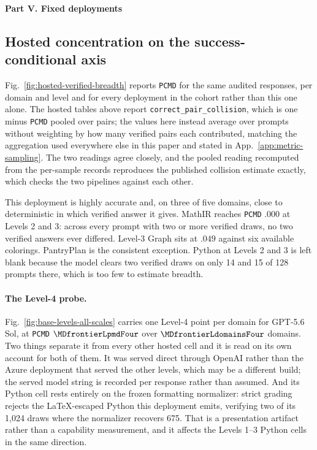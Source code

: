 \documentclass{article}
\newcommand{\1}{\mathbf 1}
\newcommand{\pmd}{\texttt{PCMD}}
\theoremstyle{remark}
\theoremstyle{definition}
\theoremstyle{plain}
\begin{document}




\clearpage
{}
\begin{center}\large\textbf{Part V. Fixed deployments}\end{center}



\subsection{Hosted concentration on the success-conditional axis}
\label{app:hosted-mode-diversity}

Fig.~\ref{fig:hosted-verified-breadth} reports \pmd{} for the same audited
responses, per domain and level and for every deployment in the cohort rather
than this one alone. The hosted tables above report \texttt{correct\_pair\_collision},
which is one minus \pmd{} pooled over pairs; the values here instead average
over prompts without weighting by how many verified pairs each contributed,
matching the aggregation used everywhere else in this paper and stated in
App.~\ref{app:metric-sampling}. The two readings agree closely,
and the pooled reading recomputed from the per-sample records reproduces the
published collision estimate exactly, which checks the two pipelines against
each other.

This deployment is highly accurate and, on three of five domains, close to
deterministic in which verified answer it gives. MathIR reaches \pmd{} $.000$
at Levels 2 and 3: across every prompt with two or more verified draws, no two
verified answers ever differed. Level-3 Graph sits at $.049$ against six
available colorings. PantryPlan is the consistent exception. Python at Levels 2
and 3 is left blank because the model clears two verified draws on only 14 and
15 of 128 prompts there, which is too few to estimate breadth.

\paragraph{The Level-4 probe.}
Fig.~\ref{fig:base-levels-all-scales} carries one Level-4 point per domain for
GPT-5.6 Sol, at \pmd{} $\MDfrontierLpmdFour$ over $\MDfrontierLdomainsFour$
domains. Two things separate it from every other hosted cell and it is read
on its own account for both of them. It was
served direct through OpenAI rather than the Azure deployment that served the
other levels, which may be a different build; the served model string is
recorded per response rather than assumed. And its Python cell rests entirely on
the frozen formatting normalizer: strict grading rejects the LaTeX-escaped
Python this deployment emits, verifying two of its 1,024 draws where the
normalizer recovers 675. That is a presentation artifact rather than a capability
measurement, and it affects the Levels 1--3 Python cells in the same direction.
\end{document}
